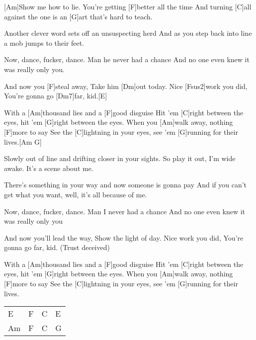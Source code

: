 

\begin{guitar}
	[Am]Show me how to lie. You're getting [F]better all the time
	And turning [C]all against the one is an [G]art that's hard to teach.
	
	Another clever word sets off an unsuspecting herd
	And as you step back into line a mob jumps to their feet.
	
	Now, dance, fucker, dance. Man he never had a chance
	And no one even knew it was really only you.
	
	And now you [F]steal away,
	Take him [Dm]out today.
	Nice [Fsus2]work you did,
	You're gonna go [Dm7]far, kid.[E]{}
	
	\begin{highlightbar}
		With a [Am]thousand lies and a [F]good disguise
		Hit 'em [C]right between the eyes, hit 'em [G]right between the eyes.
		When you [Am]walk away, nothing [F]more to say
		See the [C]lightning in your eyes, see 'em [G]running for their lives.[Am G]{}
	\end{highlightbar}
	
	\songsection{Verse 2}
	Slowly out of line and drifting closer in your sights.
	So play it out, I'm wide awake. It's a scene about me.
	
	There's something in your way and now someone is gonna pay
	And if you can't get what you want, well, it's all because of me.
	
	Now, dance, fucker, dance. Man I never had a chance
	And no one even knew it was really only you
	
	\songsection{Pre-Chorus}
	And now you'll lead the way,
	Show the light of day.
	Nice work you did,
	You're gonna go far, kid. (Trust deceived)
	
	\begin{highlightbar}
		\songsection{Chorus}
		With a [Am]thousand lies and a [F]good disguise
		Hit 'em [C]right between the eyes, hit 'em [G]right between the eyes.
		When you [Am]walk away, nothing [F]more to say
		See the [C]lightning in your eyes, see 'em [G]running for their lives.
	\end{highlightbar}
	
	{\footnotesize\begin{tabular}{|l|l|l|l|}
			E  & F & C & E \\
			Am & F & C & G
	\end{tabular}}
	

\end{guitar}
